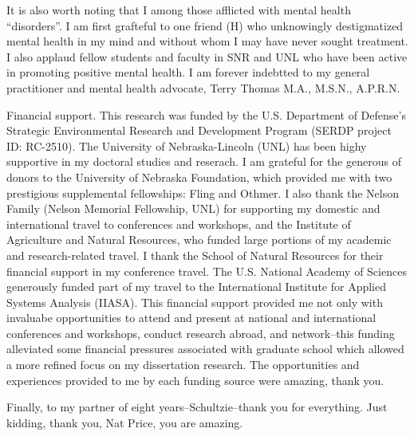 \documentclass[12pt,twoside,openany]{reedthesis}
\begin{document}
\begin{acknowledgements}
   It is also worth noting that I among those afflicted with mental health ``disorders''. I am first grafteful to one friend (H) who unknowingly destigmatized mental health in my mind and without whom I may have never sought treatment. I also applaud fellow students and faculty in SNR and UNL who have been active in promoting positive mental health. I am forever indebtted to my general practitioner and mental health advocate, Terry Thomas M.A., M.S.N., A.P.R.N.
   
   Financial support. This research was funded by the U.S. Department of Defense's Strategic Environmental Research and Development Program (SERDP project ID: RC-2510). The University of Nebraska-Lincoln (UNL) has been highy supportive in my doctoral studies and reserach. I am grateful for the generous of donors to the University of Nebraska Foundation, which provided me with two prestigious supplemental fellowships: Fling and Othmer. I also thank the Nelson Family (Nelson Memorial Fellowship, UNL) for supporting my domestic and international travel to conferences and workshops, and the Institute of Agriculture and Natural Resources, who funded large portions of my academic and research-related travel. I thank the School of Natural Resources for their financial support in my conference travel. The U.S. National Academy of Sciences generously funded part of my travel to the International Institute for Applied Systems Analysis (IIASA). This financial support provided me not only with invaluabe opportunities to attend and present at national and international conferences and workshops, conduct research abroad, and network--this funding alleviated some financial pressures associated with graduate school which allowed a more refined focus on my dissertation research. The opportunities and experiences provided to me by each funding source were amazing, thank you.
   
   Finally, to my partner of eight years--Schultzie--thank you for everything. Just kidding, thank you, Nat Price, you are amazing.
 \end{acknowledgements}
  \hypersetup{linkcolor=black}
  \setcounter{tocdepth}{2}
  \tableofcontents

  \listoftables
\end{document}

